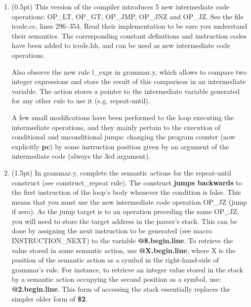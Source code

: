 \documentclass[letter,10pt]{article}
\begin{document}
\begin{enumerate}

\item (0.5pt)
This version of the compiler introduces 5 new intermediate code operations: OP\_LT, OP\_GT,
OP\_JMP, OP\_JNZ and OP\_JZ. See the file icode.cc, lines 296--354.
Read their implementation to be sure you understand their semantics.
The corresponding constant definitions and instruction codes have been added to icode.hh,
and can be used as new intermediate code operations.

Also observe the new rule l\_expr in grammar.y, which allows to compare two integer
expressions and store the result of this comparison in an intermediate variable.
The action stores a pointer to the intermediate variable generated for any other
rule to use it (e.g. repeat-until).

A few small modifications have been performed to the loop executing the intermediate
operations, and they mainly pertain to the execution of conditional and unconditional
jumps: changing the program counter (now explicitly {\bf pc}) by some instruction
position given by an argument of the intermediate code (always the 3rd argument).

\item (1.5pt)
In grammar.y, complete the semantic actions  for the repeat-until construct (see construct\_repeat rule).
The construct {\bf jumps backwards} to the first instruction of the loop's body whenever the condition is false.
This means that you must use the new intermediate code operation OP\_JZ (jump if zero).
As the jump target is to an operation preceding the same OP\_JZ, you will need to store the target
address in the parser's stack. This can be done by assigning the next instruction to be generated
(see macro INSTRUCTION\_NEXT) to the variable {\bf @\$.begin.line}.
To retrieve the value stored in some semantic action, use {\bf @X.begin.line}, where X is the position
of the semantic action as a symbol in the right-hand-side of grammar's rule. For instance,
to retrieve an integer value stored in the stack by a semantic action occupying the second position
as a symbol, use: {\bf @2.begin.line}. This form of accessing the stack essentially replaces the simpler
older form of {\bf \$2}.


\end{enumerate}
\end{document}
